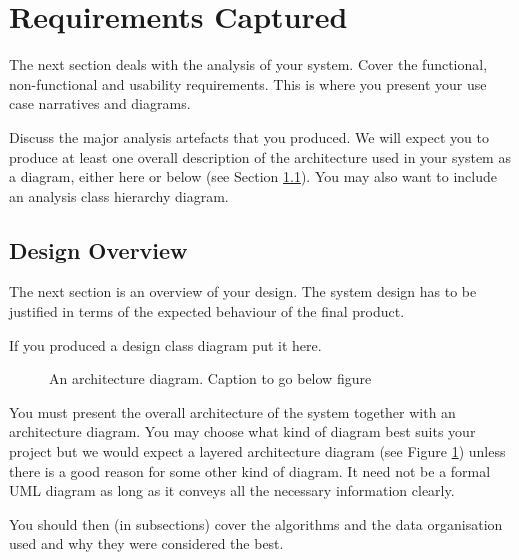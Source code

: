 \section{Requirements Captured}
The next section deals with the analysis of your system. Cover the
functional, non-functional and usability requirements. This is where
you present your use case narratives and diagrams. 

Discuss the major analysis artefacts that you produced. We will expect
you to produce at least one overall description of the architecture
used in your system as a diagram, either here or below (see Section
\ref{ss:design-overview}). You may also want to include an analysis
class hierarchy diagram.

\subsection{Design Overview}
\label{ss:design-overview}

The next section is an overview of your design. The system design has
to be justified in terms of the expected behaviour of the final
product. 

If you produced a design class diagram put it here.

\begin{figure}[h!]
  \caption{An architecture diagram. Caption to go below figure}
  \label{fig:architecture}
\end{figure}

You must present the overall architecture of the system together with
an architecture diagram. You may choose what kind of diagram best
suits your project but we would expect a layered architecture diagram
(see Figure \ref{fig:architecture}) unless there is a good reason for
some other kind of diagram. It need not be a formal UML diagram as
long as it conveys all the necessary information clearly.

You should then (in subsections) cover the algorithms and the data
organisation used and why they were considered the best. 

